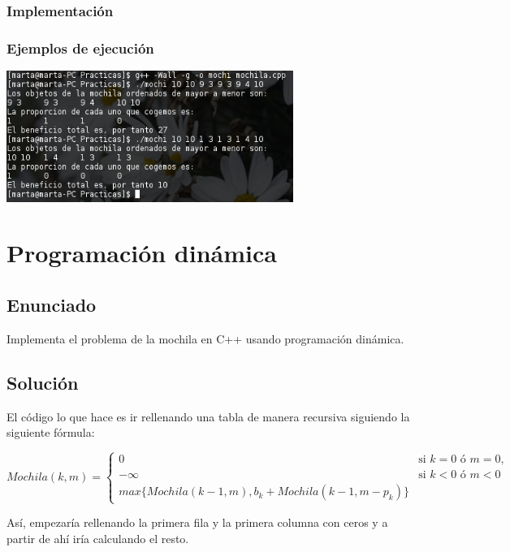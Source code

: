 \documentclass[10pt,a4paper,spanish]{report}
\begin{document}
\subsection{\textcolor[rgb]{1,0.2,0.8}Implementación}

\subsection{\textcolor[rgb]{0.5,0.2,1}Ejemplos de ejecución}
\begin{center}
\includegraphics[width=0.7\textwidth]{voraces_ej}
\end{center}

\chapter{\textcolor[rgb]{0.2, 0.55, 0.2}Programación dinámica}
\section{\textcolor[rgb]{0.1,0.54,0.7}Enunciado}
{\Large Implementa el problema de la mochila en C++ usando programación dinámica.}

\section{\textcolor[rgb]{0.6,0.4,0.6}Solución}
El código lo que hace es ir rellenando una tabla de manera recursiva siguiendo la siguiente fórmula:

\begin{equation*}
Mochila(k,m) = 
\begin{cases}
0 & \text{si } k = 0 \text{ ó } m = 0,\\
-\infty & \text{si } k<0 \text{ ó } m<0\\
max\{Mochila(k-1,m), b_k + Mochila(k-1,m-p_k)\}
\end{cases} 
\end{equation*}

Así, empezaría rellenando la primera fila y la primera columna con ceros y a partir de ahí iría calculando el resto.
\end{document}
